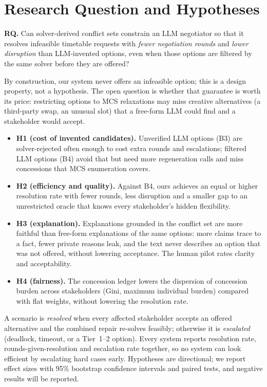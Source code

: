 \documentclass[11pt,a4paper]{article}
\begin{document}
\section{Research Question and Hypotheses}
\label{sec:rq}
\begin{keybox}
\textbf{RQ.} Can solver-derived conflict sets constrain an LLM negotiator so
that it resolves infeasible timetable requests with \emph{fewer negotiation
rounds} and \emph{lower disruption} than LLM-invented options, even when
those options are filtered by the same solver before they are offered?
\end{keybox}
\noindent By construction, our system never offers an infeasible option;
this is a design property, not a hypothesis. The open question is whether
that guarantee is worth its price: restricting options to MCS relaxations
may miss creative alternatives (a third-party swap, an unusual slot) that a
free-form LLM could find and a stakeholder would accept.
\begin{itemize}
  \item \textbf{H1 (cost of invented candidates).} Unverified LLM options (B3)
  are solver-rejected often enough to cost extra rounds and escalations;
  filtered LLM options (B4) avoid that but need more regeneration calls and
  miss concessions that MCS enumeration covers.
  \item \textbf{H2 (efficiency and quality).} Against B4, ours achieves an
  equal or higher resolution rate with fewer rounds, less disruption and a
  smaller gap to an unrestricted oracle that knows every stakeholder's hidden
  flexibility.
  \item \textbf{H3 (explanation).} Explanations grounded in the conflict set
  are more faithful than free-form explanations of the same options: more
  claims trace to a fact, fewer private reasons leak, and the text never
  describes an option that was not offered, without lowering acceptance.
  The human pilot rates clarity and acceptability.
  \item \textbf{H4 (fairness).} The concession ledger lowers the dispersion
  of concession burden across stakeholders (Gini, maximum individual burden)
  compared with flat weights, without lowering the resolution rate.
\end{itemize}
A scenario is \emph{resolved} when every affected stakeholder accepts an
offered alternative and the combined repair re-solves feasibly; otherwise it
is \emph{escalated} (deadlock, timeout, or a Tier~1--2 option). Every system
reports resolution rate, rounds-given-resolution and escalation rate
together, so no system can look efficient by escalating hard cases early.
Hypotheses are directional; we report effect sizes with 95\% bootstrap
confidence intervals and paired tests, and negative results will be
reported.
\end{document}
